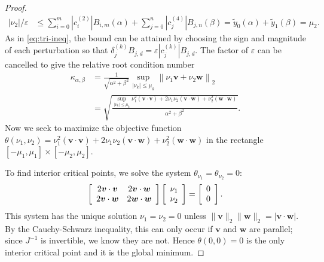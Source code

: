 \documentclass[3p, authoryear, square]{elsarticle}
\theoremstyle{definition}
\newcommand{\eps}{\varepsilon}
\begin{document}
\begin{proof}
\begin{align}
\left|\nu_2\right| / \eps &\leq \sum_{i = 0}^m
  \left|c_{i}^{(2)}\right| B_{i, m}\left(\alpha\right) + \sum_{j = 0}^n
  \left|c_{j}^{(4)}\right| B_{j, n}\left(\beta\right) =
  \widetilde{y}_0(\alpha) + \widetilde{y}_1(\beta) = \mu_2.
\end{align}
As in \eqref{eq:tri-ineq}, the bound can be attained by choosing the
sign and magnitude of each perturbation so that
\(\delta_j^{(k)} B_{j, d} = \eps \left|c_j^{(k)}\right| B_{j, d}\).
The factor of \(\eps\) can be cancelled to give the relative root
condition number
\begin{align}
\kappa_{\alpha, \beta} &= \frac{1}{\sqrt{\alpha^2 + \beta^2}}
  \sup_{\left|\nu_k\right| \leq \mu_k} \left \lVert \nu_1 \bm{v} +
  \nu_2 \bm{w} \right \rVert_2 \\
  &=
  \sqrt{\frac{\sup_{\left|\nu_k\right| \leq \mu_k}
  \nu_1^2 \left(\bm{v} \cdot \bm{v}\right) +
  2 \nu_1 \nu_2 \left(\bm{v} \cdot \bm{w}\right) +
  \nu_2^2 \left(\bm{w} \cdot \bm{w}\right)}{\alpha^2 + \beta^2}}
  \label{eq:intersect-cond-num}.
\end{align}
Now we seek to maximize the objective function \(\theta(\nu_1, \nu_2) =
\nu_1^2 \left(\bm{v} \cdot \bm{v}\right) +
2 \nu_1 \nu_2 \left(\bm{v} \cdot \bm{w}\right) +
\nu_2^2 \left(\bm{w} \cdot \bm{w}\right)\) in the rectangle
\(\left[-\mu_1, \mu_1\right] \times \left[-\mu_2, \mu_2\right]\).

To find interior critical points, we solve the system \(\theta_{\nu_1} =
\theta_{\nu_2} = 0\):
\begin{equation}
\left[ \begin{array}{c c}
  2 \bm{v} \cdot \bm{v} & 2 \bm{v} \cdot \bm{w} \\
  2 \bm{v} \cdot \bm{w} & 2 \bm{w} \cdot \bm{w} \end{array}\right]
\left[ \begin{array}{c} \nu_1 \\ \nu_2 \end{array}\right] =
\left[ \begin{array}{c} 0 \\ 0 \end{array}\right].
\end{equation}
This system has the unique solution \(\nu_1 = \nu_2 = 0\) unless
\(\|\bm{v}\|_2 \|\bm{w}\|_2 = \left|\bm{v} \cdot \bm{w}\right|\).
By the Cauchy-Schwarz inequality, this can only occur if \(\bm{v}\) and
\(\bm{w}\) are parallel; since \(J^{-1}\) is invertible, we know they
are not. Hence \(\theta(0, 0) = 0\) is the only interior critical point and
it is the global minimum.


\end{proof}
\end{document}
